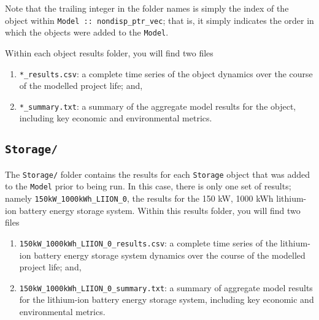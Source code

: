 \documentclass[12pt, letterpaper]{report}
\begin{document}
\noindent Note that the trailing integer in the folder names is simply the index of the object within \texttt{Model :: nondisp\_ptr\_vec}; that is, it simply indicates the order in which the objects were added to the \texttt{Model}.\par 
Within each object results folder, you will find two files

\begin{enumerate}
    \item \texttt{*\_results.csv}: a complete time series of the object dynamics over the course of the modelled project life; and,
    \item \texttt{*\_summary.txt}: a summary of the aggregate model results for the object, including key economic and environmental metrics.
\end{enumerate}

\subsection{\texttt{Storage/}}

The \texttt{Storage/} folder contains the results for each \texttt{Storage} object that was added to the \texttt{Model} prior to being run. In this case, there is only one set of results; namely \texttt{150kW\_1000kWh\_LIION\_0}, the results for the 150 kW, 1000 kWh lithium-ion battery energy storage system. Within this results folder, you will find two files

\begin{enumerate}
    \item \texttt{150kW\_1000kWh\_LIION\_0\_results.csv}: a complete time series of the lithium-ion battery energy storage system dynamics over the course of the modelled project life; and,
    \item \texttt{150kW\_1000kWh\_LIION\_0\_summary.txt}: a summary of aggregate model results for the lithium-ion battery energy storage system, including key economic and environmental metrics.
\end{enumerate}


% 
% 




\end{document}
